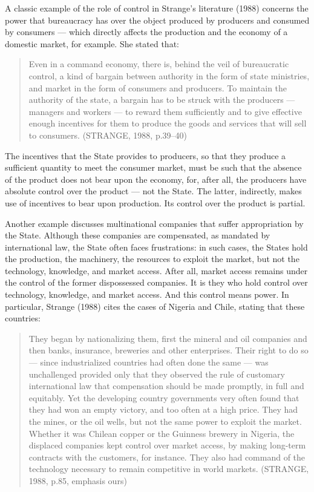 A classic example of the role of control in Strange's literature (1988) concerns the power that bureaucracy has over the object produced by producers and consumed by consumers --- which directly affects the production and the economy of a domestic market, for example. She stated that:

\begin{quote}
Even in a command economy, there is, behind the veil of bureaucratic control, a kind of bargain between authority in the form of state ministries, and market in the form of consumers and producers. To maintain the authority of the state, a bargain has to be struck with the producers --- managers and workers --- to reward them sufficiently and to give effective enough incentives for them to produce the goods and services that will sell to consumers. (STRANGE, 1988, p.39--40)
\end{quote}

The incentives that the State provides to producers, so that they produce a sufficient quantity to meet the consumer market, must be such that the absence of the product does not bear upon the economy, for, after all, the producers have absolute control over the product --- not the State. The latter, indirectly, makes use of incentives to bear upon production. Its control over the product is partial.

Another example discusses multinational companies that suffer appropriation by the State. Although these companies are compensated, as mandated by international law, the State often faces frustrations: in such cases, the States hold the production, the machinery, the resources to exploit the market, but not the technology, knowledge, and market access. After all, market access remains under the control of the former dispossessed companies. It is they who hold control over technology, knowledge, and market access. And this control means power. In particular, Strange (1988) cites the cases of Nigeria and Chile, stating that these countries:

\begin{quote}
They began by nationalizing them, first the mineral and oil companies and then banks, insurance, breweries and other enterprises. Their right to do so --- since industrialized countries had often done the same --- was unchallenged provided only that they observed the rule of customary international law that compensation should be made promptly, in full and equitably. Yet the developing country governments very often found that they had won an empty victory, and too often at a high price. They had the mines, or the oil wells, but not the same power to exploit the market. Whether it was Chilean copper or the Guinness brewery in Nigeria, the displaced companies kept control over market access, by making long-term contracts with the customers, for instance. They also had command of the technology necessary to remain competitive in world markets. (STRANGE, 1988, p.85, emphasis ours)
\end{quote}

